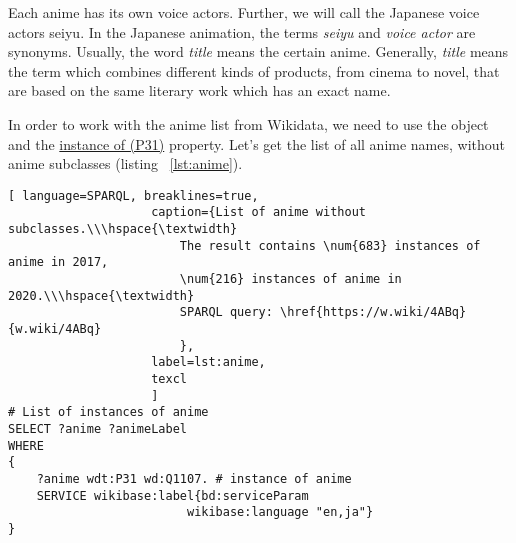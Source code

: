 Each anime has its own voice actors. Further, we will call the Japanese voice actors seiyu. In the Japanese animation, the terms \emph{seiyu} and \emph{voice actor} are synonyms. Usually, the word \emph{title} means the certain anime. Generally, \emph{title} means the term which combines different kinds of products, from cinema to novel, that are based on the same literary work which has an exact name.

In order to work with the anime list from Wikidata, we need to use the  object and the \href{https://www.wikidata.org/wiki/Property:P31}{instance of (P31)} property. Let's get the list of all anime names, without anime subclasses (listing ~\protect\ref{lst:anime}).

\begin{lstlisting}[ language=SPARQL, breaklines=true, 
                    caption={List of anime without subclasses.\\\hspace{\textwidth}
                        The result contains \num{683} instances of anime in 2017, 
                        \num{216} instances of anime in 2020.\\\hspace{\textwidth}
                        SPARQL query: \href{https://w.wiki/4ABq}{w.wiki/4ABq}
                        },
                    label=lst:anime,
                    texcl 
                    ]
# List of instances of anime
SELECT ?anime ?animeLabel
WHERE
{
    ?anime wdt:P31 wd:Q1107. # instance of anime
    SERVICE wikibase:label{bd:serviceParam
					     wikibase:language "en,ja"}
}
\end{lstlisting}%